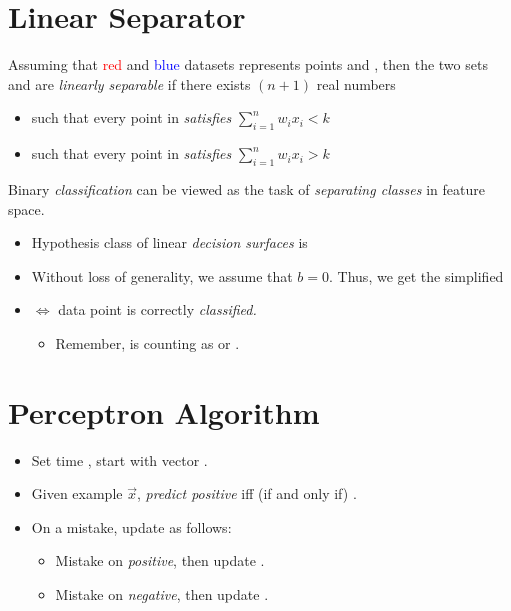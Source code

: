 \documentclass[
	title={SVM}
]{cs584notes}
\begin{document}

\tableofcontents

\section{Linear Separator}\label{sec:linear-separator}
Assuming that \textcolor{red}{red} and \textcolor{blue}{blue} datasets represents points  and , then the two sets  and  are \emph{linearly separable} if there exists $(n+1)$ real numbers 
\begin{itemize}
	\item such that every point in  \emph{satisfies} $ \sum_{i=1}^{n} w_{i}x_{i} < k $
	\item such that every point in  \emph{satisfies} $ \sum_{i=1}^{n} w_{i}x_{i} > k $
\end{itemize}

Binary \emph{classification}  can be viewed as the task of \emph{separating classes} in feature space.
\begin{itemize}
	\item Hypothesis class of linear \emph{decision surfaces} is 
	\item Without loss of generality, we assume that $b=0$. Thus, we get the simplified 
	\item {} $\Leftrightarrow$ data point  is correctly \emph{classified.}
	\begin{itemize}
		\item Remember,  is counting as  or .
	\end{itemize}
\end{itemize}

\section{Perceptron Algorithm}\label{sec:perceptron-algorithm}
\begin{itemize}
	\item Set time , start with vector .
	\item Given example $\vec{x}$, \emph{predict positive} iff (if and only if) .
	\item On a mistake, update as follows:
	\begin{itemize}
		\item Mistake on \emph{positive}, then update .
		\item Mistake on \emph{negative}, then update .
	\end{itemize}
\end{itemize}
\end{document}
